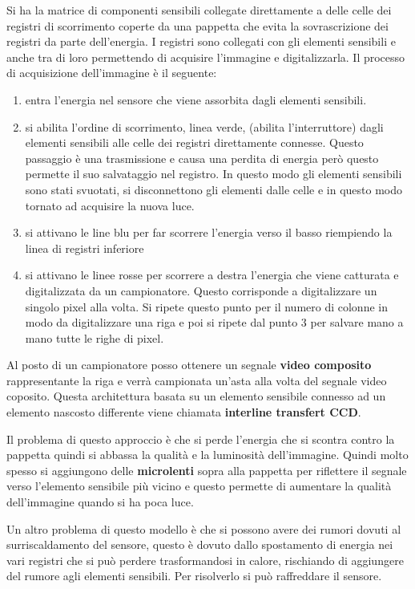 Si ha la matrice di componenti sensibili collegate direttamente a delle celle dei 
registri di scorrimento coperte da una pappetta che evita la sovrascrizione dei 
registri da parte dell'energia. I registri sono collegati con gli elementi sensibili 
e anche tra di loro permettendo di acquisire l'immagine e digitalizzarla. Il 
processo di acquisizione dell'immagine è il seguente:
\begin{enumerate}
    \item entra l'energia nel sensore che viene assorbita dagli elementi sensibili.
    \item si abilita l'ordine di scorrimento, linea verde, (abilita l'interruttore) dagli elementi 
    sensibili alle celle dei registri direttamente connesse. Questo passaggio è
    una trasmissione e causa una perdita di energia però questo permette il suo 
    salvataggio nel registro. In questo modo gli elementi sensibili sono stati 
    svuotati, si disconnettono gli elementi dalle celle e in questo modo tornato 
    ad acquisire la nuova luce.
    \item si attivano le line blu per far scorrere l'energia verso il basso riempiendo 
    la linea di registri inferiore
    \item si attivano le linee rosse per scorrere a destra l'energia che viene 
    catturata e digitalizzata da un campionatore. Questo corrisponde a digitalizzare 
    un singolo pixel alla volta. Si ripete questo punto per il numero di colonne
    in modo da digitalizzare una riga e poi si ripete dal punto $3$ per salvare 
    mano a mano tutte le righe di pixel. 
\end{enumerate} 

Al posto di un campionatore posso ottenere un segnale \textbf{video composito} 
rappresentante la riga e verrà campionata un'asta alla volta del segnale video coposito.
Questa architettura basata su un elemento sensibile connesso ad un elemento 
nascosto differente viene chiamata \textbf{interline transfert CCD}.

Il problema di questo approccio è che si perde l'energia che si scontra contro la 
pappetta quindi si abbassa la qualità e la luminosità dell'immagine. Quindi molto 
spesso si aggiungono delle \textbf{microlenti} sopra alla pappetta per riflettere 
il segnale verso l'elemento sensibile più vicino e questo permette di aumentare la 
qualità dell'immagine quando si ha poca luce.

Un altro problema di questo modello è che si possono avere dei rumori dovuti al 
surriscaldamento del sensore, questo è dovuto dallo spostamento di energia nei 
vari registri che si può perdere trasformandosi in calore, rischiando di aggiungere 
del rumore agli elementi sensibili. Per risolverlo si può raffreddare il sensore.

